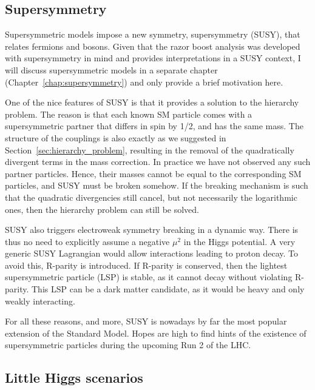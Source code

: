 \subsection{Supersymmetry \label{sec:supersymmetry}}

Supersymmetric models impose a new symmetry, supersymmetry (SUSY), that relates fermions and
bosons. Given that the razor boost analysis was developed with supersymmetry in mind and provides
interpretations in a SUSY context, I will discuss supersymmetric models in a separate chapter
(Chapter~\ref{chap:supersymmetry}) and only provide a brief motivation here. 

One of the nice features of SUSY is that it provides a solution to the hierarchy problem. 
The reason is that each known SM particle comes with a supersymmetric partner that differs in
spin by 1/2, and has the same mass. The structure of the couplings is also exactly as we suggested
in Section~\ref{sec:hierarchy_problem}, resulting in the removal of the quadratically divergent
terms in the mass correction. In practice we have not observed any such partner particles. Hence,
their masses cannot be equal to the corresponding SM particles, and SUSY must be broken somehow. 
If the breaking mechanism is such that the quadratic divergencies still cancel, but not necessarily
the logarithmic ones, then the hierarchy problem can still be solved. 

SUSY also triggers electroweak symmetry breaking in a dynamic way. There is thus no need to
explicitly assume a negative $\mu^2$ in the Higgs potential. 
A very generic SUSY Lagrangian would allow interactions leading to proton decay. To avoid this,
R-parity is introduced. If R-parity is conserved, then the lightest supersymmetric particle (LSP) is
stable, as it cannot decay without violating R-parity. This LSP can be a dark matter candidate, as
it would be heavy and only weakly interacting. 

For all these reasons, and more, SUSY is nowadays by far the most popular extension of the Standard
Model. Hopes are high to find hints of the existence of supersymmetric particles during the
upcoming Run 2 of the LHC. 

\subsection{Little Higgs scenarios \label{sec:little_higgs}}

